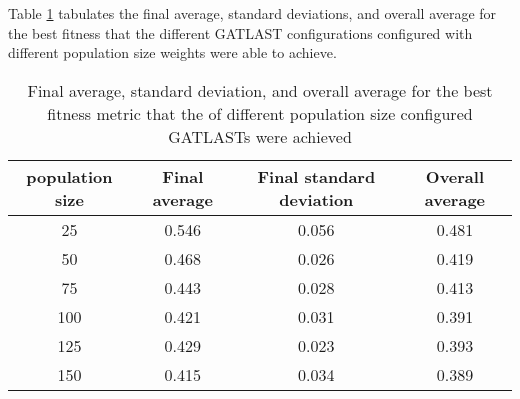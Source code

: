 Table \ref{tab:HP:GA:populationSize:best fitness} tabulates the final average, standard deviations, and overall average for the best fitness that the different GATLAST configurations configured with different population size weights were able to achieve.
\begin{table}[tbh!]
\centering
\begin{adjustbox}{trim=0cm 0cm 0cm 0cm, clip=true}
\begin{tabular}{|c|c|c|c|}
\hline
population size & Final average & Final standard deviation & Overall average\\
\hline
25 & 0.546 & 0.056 & 0.481\\\hline
50 & 0.468 & 0.026 & 0.419\\\hline
75 & 0.443 & 0.028 & 0.413\\\hline
100 & 0.421 & 0.031 & 0.391\\\hline
125 & 0.429 & 0.023 & 0.393\\\hline
150 & 0.415 & 0.034 & 0.389\\\hline
\end{tabular}
\end{adjustbox}
\caption{Final average, standard deviation, and overall average for the best fitness metric that the of different population size configured GATLASTs were achieved}
\label{tab:HP:GA:populationSize:best fitness}
\end{table}